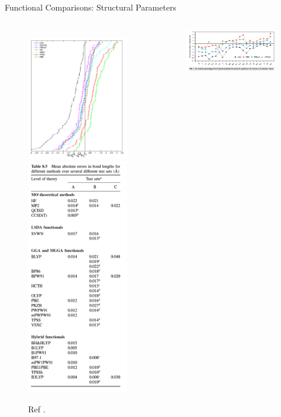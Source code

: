 \documentclass[aspectratio=169]{beamer}
\begin{document}
\begin{frame}{Functional Comparisons: Structural Parameters}
\begin{columns}
\begin{figure}
    \includegraphics[width=0.55\linewidth]{lectures/figures/5_bond_lengths.png}
    \includegraphics[width=0.3\linewidth]{lectures/figures/6_bond_lengths.png}
    \caption{Ref \cite{haasCalculationLatticeConstant2009, cramerEssentialsComputationalChemistry2004}.}
\end{figure}
\begin{figure}
    \includegraphics[width=0.9\linewidth]{lectures/figures/6_equilibrium_vol.png}

\end{figure}
\end{columns}
\end{frame}
\end{document}
